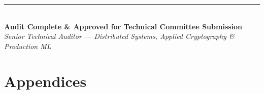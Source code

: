 \documentclass[10pt,a4paper]{report}
\begin{document}
\vspace{0.8cm}
\begin{center}
\rule{0.6\linewidth}{0.5pt}\\[0.2cm]
\textsf{\textbf{Audit Complete \& Approved for Technical Committee Submission}}\\[0.1cm]
\textit{Senior Technical Auditor --- Distributed Systems, Applied Cryptography \& Production ML}
\end{center}

\chapter{Appendices}
\end{document}
